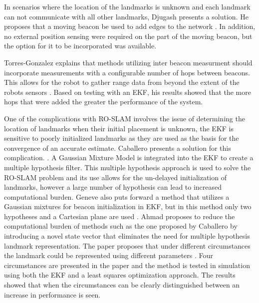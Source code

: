 \documentclass[conference]{IEEEtran}
\begin{document}
In scenarios where the location of the landmarks is unknown and each landmark can not communicate with all other landmarks, Djugash presents a solution. He proposes that a moving beacon be used to add edges to the network \cite{Djugash2006}. In addition, no external position sensing were required on the part of the moving beacon, but the option for it to be incorporated was available. 

Torres-Gonzalez explains that methods utilizing inter beacon measurment should incorporate measurements with a configurable number of hops between beacons. This allows for the robot to gather range data from beyond the extent of the robots sensors \cite{Torres-Gonzalez2015}. Based on testing with an EKF, his results showed that the more hops that were added the greater the performance of the system. 

One of the complications with RO-SLAM involves the issue of determining the location of landmarks when their initial placement is unknown, the EKF is sensitive to poorly initialized landmarks as they are used as the basis for the convergence of an accurate estimate. Caballero presents a solution for this complication. \cite{Caballero2010}. A Gaussian Mixture Model is integrated into the EKF to create a multiple hypothesis filter.  This multiple hypothesis approach is used to solve the RO-SLAM problem and its use allows for the un-delayed initialization of landmarks, however a large number of hypothesis can lead to increased computational burden. Geneve
also puts forward a method that utilizes a Gaussian mixtures for beacon initialization in EKF, but in this method only two hypotheses and a Cartesian plane are used \cite{Geneve2015}.  Ahmad proposes to reduce the computational burden of methods such as the one proposed by Caballero \cite{Caballero2010} by introducing a novel state vector that eliminates the need for multiple hypothesis landmark representation. The paper proposes that under different circumstances the landmark could be represented using different parameters  \cite{Ahmad2011a}. Four circumstances are presented in the paper and the method is tested in simulation using both the EKF and a least squares optimization approach. The results showed that when the circumstances can be clearly distinguished between an increase in performance is seen.
\end{document}
